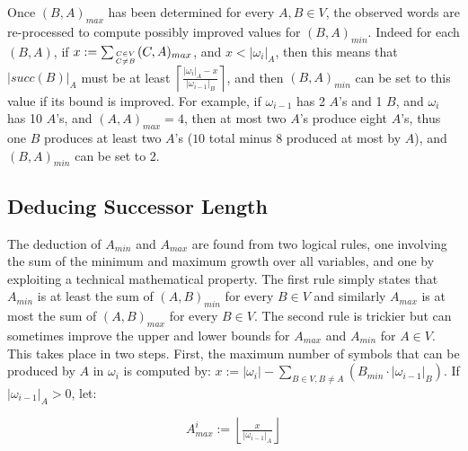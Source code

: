\documentclass{llncs}
\begin{document}
	Once $(B,A)_{max}$ has been determined for every $A,B  \in V$, the observed words are re-processed to compute possibly improved values for $(B,A)_{min}$. Indeed for each $(B,A)$, if $x := \sum_{C \in V \atop C \neq B} (C,A)_{max}$, and $x < |\omega_{i}|_{A}$, then this means that $|succ(B)|_{A}$ must be at least $\left \lceil \tfrac{|\omega_{i}|_{A} - x} {|\omega_{i-1}|_{B}} \right \rceil$, and then $(B,A)_{min}$ can be set to this value if its bound is improved. For example, if $\omega_{i-1}$ has 2 $A$'s and 1 $B$, and $\omega_{i}$ has 10 $A$'s, and $(A,A)_{max} = 4$, then at most two $A$'s produce eight $A$'s, thus one $B$ produces at least two $A$'s ($10$ total minus $8$ produced at most by $A$), and $(B,A)_{min}$ can be set to $2$.
	
	
	
	\subsection{Deducing Successor Length}
	
	The deduction of $A_{min}$ and $A_{max}$ are found from two logical rules, one involving the sum of the minimum and maximum growth over all variables, and one by exploiting a technical mathematical property. The first rule simply states that $A_{min}$ is at least the sum of $(A,B)_{min}$ for every $B \in V$ and similarly $A_{max}$ is at most the sum of $(A,B)_{max}$ for every $B \in V$. The second rule is trickier but can sometimes improve the upper and lower bounds for $A_{max}$ and $A_{min}$ for $A \in V$. This takes place in two steps. First, the maximum number of symbols that can be produced by $A$ in $\omega_{i}$ is computed by: $x := |\omega_{i}| - \sum_{B \in V, B \neq A} (B_{min} \cdot |\omega_{i-1}|_{B})$. If $|\omega_{i-1}|_{A}  > 0$, let:
	
	\begin{equation}
	A^{i}_{max} := \left \lfloor \tfrac{x} {|\omega_{i-1}|_{A}} \right \rfloor
	\label{equation:x}
	\end{equation}
	
\end{document}
